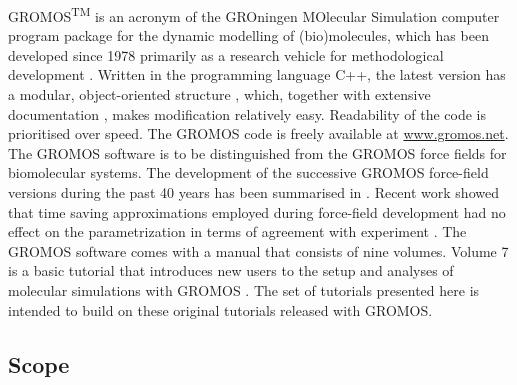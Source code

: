 %
%
GROMOS\textsuperscript{TM} is an acronym of the GROningen MOlecular Simulation computer program package for the dynamic modelling of (bio)molecules, which has been developed since 1978 primarily as a research vehicle for methodological development \cite{wfvgn_35_years}. Written in the programming language C++, the latest version has a modular, object-oriented structure \cite{Schmid_2012}, which, together with extensive documentation \cite{volumes_1_to_9}, makes modification relatively easy. Readability of the code is prioritised over speed. The GROMOS code is freely available at \url{www.gromos.net}. The GROMOS software is to be distinguished from the GROMOS force fields for biomolecular systems. The development of the successive GROMOS force-field versions during the past 40 years has been summarised in \cite{wfvgn_35_years,Riniker_FCFF}. 
Recent work showed that time saving approximations employed during force-field development had no effect on the parametrization in terms of agreement with experiment \cite{Diem_2020, Diem_2_2020}.
The GROMOS software comes with a manual that consists of nine volumes. Volume 7 is a basic tutorial that introduces new users to the setup and analyses of molecular simulations with GROMOS \cite{volume_7}.
The set of tutorials presented here is intended to build on these original tutorials released with GROMOS.

%
\subsection{Scope}


